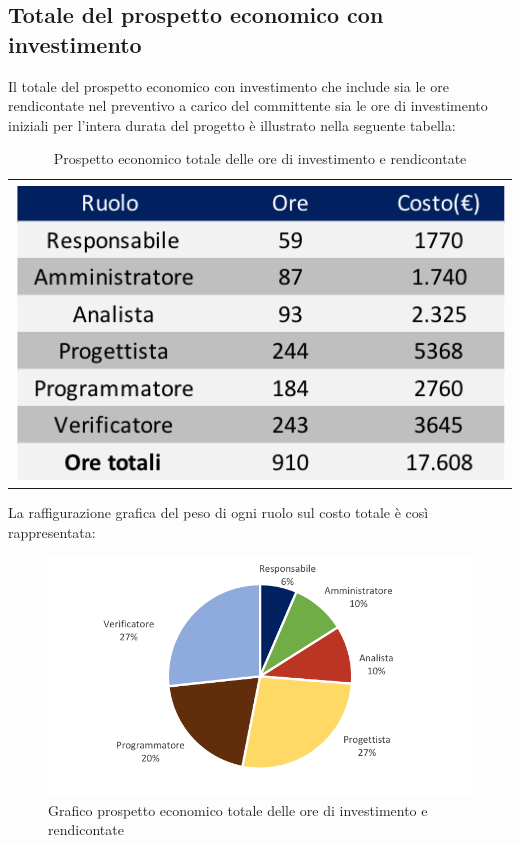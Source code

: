 \subsection{Totale del prospetto economico con investimento}
Il totale del prospetto economico con investimento che include sia le ore rendicontate nel preventivo a carico del committente sia  le ore  di investimento iniziali per l'intera durata del progetto è illustrato nella seguente tabella:
\begin{table}[!ht]
	\begin{center}
		\begin{tabular}{c}
			\includegraphics{images/tabellaOreInvestimentoEuro.png}
		\end{tabular}
		\caption{Prospetto economico totale delle ore di investimento e rendicontate}
	\end{center}
\end{table}

La raffigurazione grafica del peso di ogni ruolo sul costo totale è così rappresentata:
\begin{figure}[!ht]
	\begin{center}
		\includegraphics{images/grafoOreInvestimentoEuro.png}
		\caption{Grafico prospetto economico totale delle ore di investimento e rendicontate}
	\end{center}
\end{figure}



